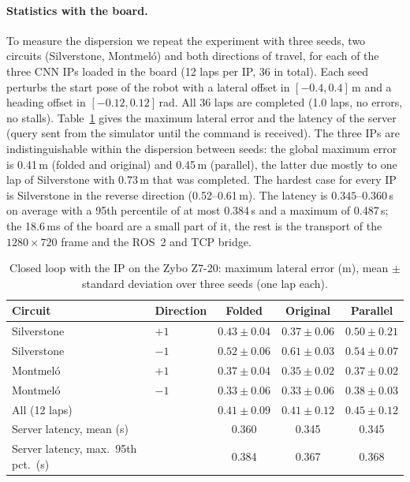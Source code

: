 \documentclass{article}
\begin{document}
\paragraph{Statistics with the board.}
To measure the dispersion we repeat the experiment with three seeds, two circuits (Silverstone, Montmel\'o) and both directions of travel, for each of the three CNN IPs loaded in the board
(12 laps per IP, 36 in total). Each seed perturbs the start pose of the robot with a lateral offset in $[-0.4,0.4]$\,m and a heading offset in $[-0.12,0.12]$\,rad. All 36 laps are completed
(1.0 laps, no errors, no stalls). Table~\ref{tab:hil} gives the maximum lateral error and the latency of the server (query sent from the simulator until the command is received).
The three IPs are indistinguishable within the dispersion between seeds: the global maximum error is 0.41\,m (folded and original) and 0.45\,m (parallel),
the latter due mostly to one lap of Silverstone with 0.73\,m that was completed. The hardest case for every IP is Silverstone in the reverse direction (0.52--0.61\,m).
The latency is $0.345$--$0.360$\,s on average with a 95th percentile of at most 0.384\,s and a maximum of 0.487\,s; the 18.6\,ms of the board are a small part of it, the rest is
the transport of the $1280{\times}720$ frame and the ROS~2 and TCP bridge.
\begin{table}[h]
\centering
\caption{Closed loop with the IP on the Zybo Z7-20: maximum lateral error (m), mean $\pm$ standard deviation over three seeds (one lap each).}
\label{tab:hil}
\begin{tabular}{llccc}
\toprule
Circuit & Direction & Folded & Original & Parallel\\
\midrule
Silverstone & $+1$ & $0.43\pm0.04$ & $0.37\pm0.06$ & $0.50\pm0.21$\\
Silverstone & $-1$ & $0.52\pm0.06$ & $0.61\pm0.03$ & $0.54\pm0.07$\\
Montmel\'o & $+1$ & $0.37\pm0.04$ & $0.35\pm0.02$ & $0.37\pm0.02$\\
Montmel\'o & $-1$ & $0.33\pm0.06$ & $0.33\pm0.06$ & $0.38\pm0.03$\\
\midrule
All (12 laps) & & $0.41\pm0.09$ & $0.41\pm0.12$ & $0.45\pm0.12$\\
Server latency, mean (s) & & 0.360 & 0.345 & 0.345\\
Server latency, max.\ 95th pct.\ (s) & & 0.384 & 0.367 & 0.368\\
\bottomrule
\end{tabular}
\end{table}
\end{document}
